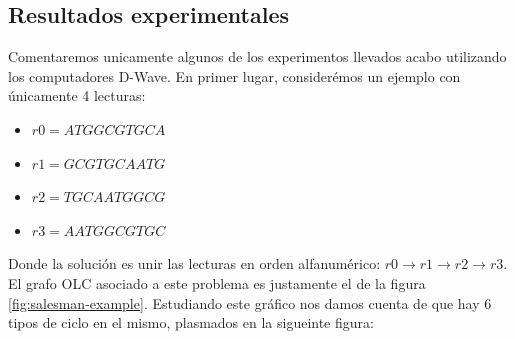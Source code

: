 \documentclass[11pt]{article}
\begin{document}
\subsection{Resultados experimentales}

Comentaremos unicamente algunos de los experimentos llevados acabo utilizando los computadores D-Wave. En primer lugar, considerémos un ejemplo con únicamente 4 lecturas:

\begin{itemize}
	\item $r0 = ATGGCGTGCA$
	\item $r1 = GCGTGCAATG$
	\item $r2 = TGCAATGGCG$
	\item $r3 = AATGGCGTGC$
\end{itemize}

Donde la solución es unir las lecturas en orden alfanumérico: $r0 \rightarrow r1 \rightarrow r2 \rightarrow r3$. El grafo OLC asociado a este problema es justamente el de la figura \ref{fig:salesman-example}. Estudiando este gráfico nos damos cuenta de que hay 6 tipos de ciclo en el mismo, plasmados en la sigueinte figura:
\end{document}
